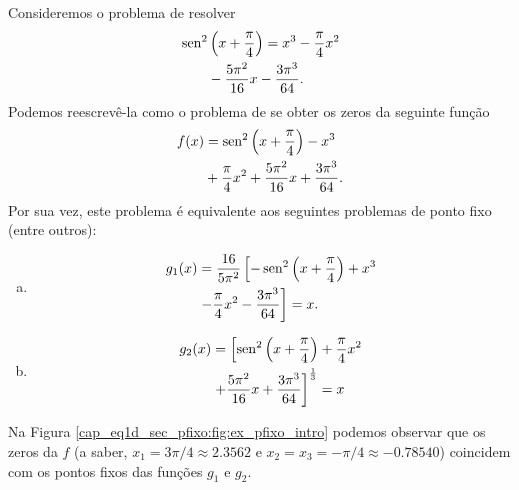 \begin{ex}\label{cap_eq1d_sec_pfixo:ex:pfixo_intro}
  Consideremos o problema de resolver
  \begin{equation}
    \begin{aligned}
      &\operatorname{sen}^2\left(x+\frac{\pi}{4}\right) = x^3 - \frac{\pi}{4}x^2 \\
      &\qquad - \frac{5\pi^2}{16}x - \frac{3\pi^3}{64}.
    \end{aligned}
\end{equation}
Podemos reescrevê-la como o problema de se obter os zeros da seguinte função
\begin{equation}
  \begin{aligned}
    f(x) &= \operatorname{sen}^2\left(x+\frac{\pi}{4}\right) - x^3 \\
         &+ \frac{\pi}{4}x^2 + \frac{5\pi^2}{16}x + \frac{3\pi^3}{64}.
  \end{aligned}
\end{equation}
Por sua vez, este problema é equivalente aos seguintes problemas de ponto fixo (entre outros):
\begin{enumerate}[a)]
\item
  \begin{equation}
    \begin{aligned}
      g_1(x) &= \frac{16}{5\pi^2}\left[-\operatorname{sen}^2\left(x+\frac{\pi}{4}\right) + x^3 \right. \\
             &\left. - \frac{\pi}{4}x^2 - \frac{3\pi^3}{64}\right] = x.
    \end{aligned}
  \end{equation}
\item
  \begin{equation}
    \begin{aligned}
      g_2(x) &= \left[\operatorname{sen}^2\left(x+\frac{\pi}{4}\right) + \frac{\pi}{4}x^2\right. \\
             &\left. + \frac{5\pi^2}{16}x + \frac{3\pi^3}{64}\right]^{\frac{1}{3}} = x
    \end{aligned}
\end{equation}
\end{enumerate}
Na Figura \ref{cap_eq1d_sec_pfixo:fig:ex_pfixo_intro} podemos observar que os zeros da $f$ (a saber, $x_1=3\pi/4\approx 2.3562$ e $x_2=x_3=-\pi/4\approx -0.78540$) coincidem com os pontos fixos das funções $g_1$ e $g_2$.


\end{ex}
